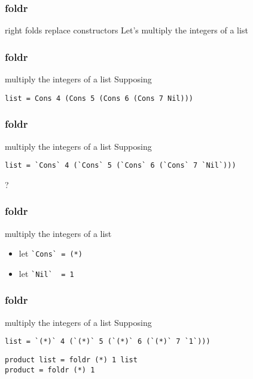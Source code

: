 \begin{frame}[fragile]
\frametitle{foldr}
\begin{block}{right folds replace constructors}
Let's multiply the integers of a list
\end{block}
\end{frame}

\begin{frame}[fragile]
\frametitle{foldr}
\begin{block}{multiply the integers of a list}
Supposing 
\begin{lstlisting}[style=haskell,basicstyle=\scriptsize\ttfamily,mathescape]
list = Cons 4 (Cons 5 (Cons 6 (Cons 7 Nil)))
\end{lstlisting}
\end{block}
\end{frame}

\begin{frame}[fragile]
\frametitle{foldr}
\begin{block}{multiply the integers of a list}
Supposing 
\begin{lstlisting}[style=haskell,basicstyle=\scriptsize\ttfamily,mathescape]
list = `Cons` 4 (`Cons` 5 (`Cons` 6 (`Cons` 7 `Nil`)))
\end{lstlisting}
\end{block}
\begin{center}
\LARGE
?
\end{center}
\end{frame}

\begin{frame}[fragile]
\frametitle{foldr}
\begin{block}{multiply the integers of a list}
\begin{itemize}
\item let \lstinline{`Cons` = (*)}
\item let \lstinline{`Nil`  = 1}
\end{itemize}
\end{block}
\end{frame}

\begin{frame}[fragile]
\frametitle{foldr}
\begin{block}{multiply the integers of a list}
Supposing 
\begin{lstlisting}[style=haskell,basicstyle=\scriptsize\ttfamily,mathescape]
list = `(*)` 4 (`(*)` 5 (`(*)` 6 (`(*)` 7 `1`)))
\end{lstlisting}
\end{block}
\begin{lstlisting}[style=haskell,basicstyle=\scriptsize\ttfamily,mathescape]
product list = foldr (*) 1 list
product = foldr (*) 1
\end{lstlisting}
\end{frame}

